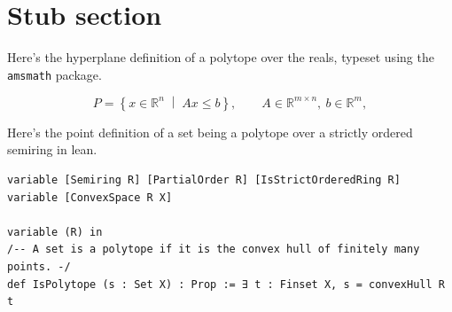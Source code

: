 \section{Stub section}

Here's the hyperplane definition of a polytope over the reals, typeset using the \texttt{amsmath} package.

\[
  P = \left\{ x \in \mathbb{R}^n \;\middle|\; A x \le b \right\},
  \qquad A \in \mathbb{R}^{m \times n},\ b \in \mathbb{R}^m,
\]

Here's the point definition of a set being a polytope over a strictly ordered semiring in lean\cite{10.1007/978-3-030-79876-5_37}.

\begin{lstlisting}
variable [Semiring R] [PartialOrder R] [IsStrictOrderedRing R]
variable [ConvexSpace R X]

variable (R) in
/-- A set is a polytope if it is the convex hull of finitely many points. -/
def IsPolytope (s : Set X) : Prop := ∃ t : Finset X, s = convexHull R t
\end{lstlisting}
